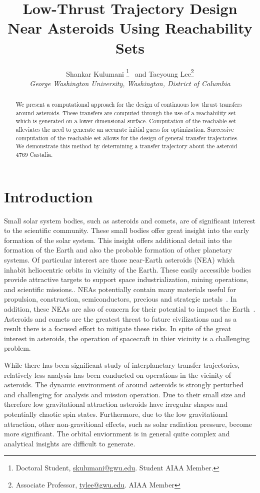\documentclass[]{aiaa-tc}%
\title{Low-Thrust Trajectory Design Near Asteroids Using Reachability Sets}
\author{
  Shankar Kulumani\thanksibid{1}%
    \thanks{Doctoral Student, \href{mailto:skulumani@gwu.edu}{skulumani@gwu.edu}. Student AIAA Member.}
  \ and Taeyoung Lee\thanksibid{2}\thanks{Associate Professor, \href{mailto:tylee@gwu.edu}{tylee@gwu.edu}. AIAA Member}\\
  {\normalsize\itshape
   George Washington University, Washington, District of Columbia }\\
   }
\begin{document}
\maketitle

\begin{abstract}\label{sec:abstract}

We present a computational approach for the design of continuous low thrust transfers around asteroids.
These transfers are computed through the use of a reachability set which is generated on a lower dimensional \Poincare surface.
Computation of the reachable set alleviates the need to generate an accurate initial guess for optimization.
Successive computation of the reachable set allows for the design of general transfer trajectories.
We demonstrate this method by determining a transfer trajectory about the asteroid 4769 Castalia.

\end{abstract}


\section{Introduction}\label{sec:introduction}

Small solar system bodies, such as asteroids and comets, are of significant interest to the scientific community.
These small bodies offer great insight into the early formation of the solar system.
This insight offers additional detail into the formation of the Earth and also the probable formation of other planetary systems.
Of particular interest are those near-Earth asteroids (NEA) which inhabit heliocentric orbits in vicinity of the Earth.
These easily accessible bodies provide attractive targets to support space industrialization, mining operations, and scientific missions..
NEAs potentially contain many materials useful for propulsion, construction, semiconductors, precious and strategic metals~\cite{ross2001}.
In addition, these NEAs are also of concern for their potential to impact the Earth~\cite{wie2008}.
Asteroids and comets are the greatest threat to future civilizations and as a result there is a focused effort to mitigate these risks.
In spite of the great interest in asteroids, the operation of spacecraft in thier vicinity is a challenging problem.

While there has been significant study of interplanetary transfer trajectories, relatively less analysis has been conducted on operations in the vicinity of asteroids.
The dynamic environment of around asteroids is strongly perturbed and challenging for analysis and mission operation.
Due to their small size and therefore low gravitational attraction asteroids have irregular shapes and potentially chaotic spin states.
Furthermore, due to the low gravitational attraction, other non-gravitional effects, such as solar radiation pressure, become more significant.
The orbital enviornment is in general quite complex and analytical insights are difficult to generate.
\end{document}

